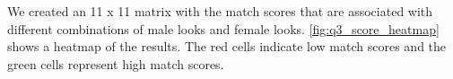 


\section{} \label{sec:q3}
We created an 11 x 11 matrix with the match scores that are associated with different combinations of male looks and female looks. \vref{fig:q3_score_heatmap} shows a heatmap of the results. The red cells indicate low match scores and the green cells represent high match scores. 

